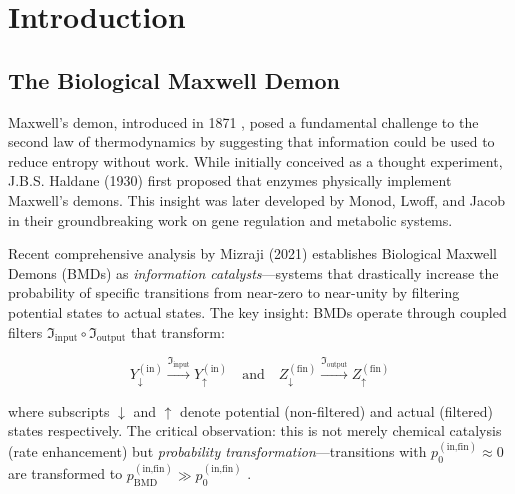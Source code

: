 \documentclass[12pt,a4paper]{article}
\begin{document}
\begin{abstract}
and organizational optimization, establishing BMDs as the fundamental computational primitive of complex adaptive systems.

\textbf{Keywords:} Biological Maxwell Demons, Saint-Entropy, miracles, strategic impossibility, categorical completion, information catalysis, sufficient statistics, fractal compression, recursive self-similarity, scale ambiguity, self-propagating cascades, problem-solution dissolution
\end{abstract}

\tableofcontents

\section{Introduction}

\subsection{The Biological Maxwell Demon}

Maxwell's demon, introduced in 1871 \cite{maxwell1871theory}, posed a fundamental challenge to the second law of thermodynamics by suggesting that information could be used to reduce entropy without work. While initially conceived as a thought experiment, J.B.S. Haldane (1930) \cite{haldane1930enzymes} first proposed that enzymes physically implement Maxwell's demons. This insight was later developed by Monod, Lwoff, and Jacob \cite{monod1971chance,jacob1970logic} in their groundbreaking work on gene regulation and metabolic systems.

Recent comprehensive analysis by Mizraji (2021) \cite{mizraji2021biological} establishes Biological Maxwell Demons (BMDs) as \textit{information catalysts}—systems that drastically increase the probability of specific transitions from near-zero to near-unity by filtering potential states to actual states. The key insight: BMDs operate through coupled filters $\Im_{\text{input}} \circ \Im_{\text{output}}$ that transform:

\begin{equation}
Y_{\downarrow}^{(\text{in})} \xrightarrow{\Im_{\text{input}}} Y_{\uparrow}^{(\text{in})} \quad \text{and} \quad Z_{\downarrow}^{(\text{fin})} \xrightarrow{\Im_{\text{output}}} Z_{\uparrow}^{(\text{fin})}
\end{equation}

where subscripts $\downarrow$ and $\uparrow$ denote potential (non-filtered) and actual (filtered) states respectively. The critical observation: this is not merely chemical catalysis (rate enhancement) but \textit{probability transformation}—transitions with $p_0^{(\text{in,fin})} \approx 0$ are transformed to $p_{\text{BMD}}^{(\text{in,fin})} \gg p_0^{(\text{in,fin})}$ \cite{mizraji2021biological}.
\end{document}
